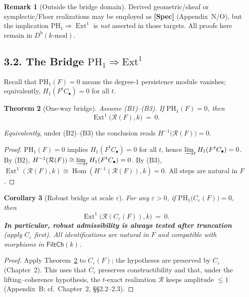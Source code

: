 \documentclass[11pt]{article}
\DeclareMathOperator{\Ext}{Ext}
\DeclareMathOperator{\Hom}{Hom}
\numberwithin{equation}{section}
\newtheorem{theorem}{Theorem}[section]
\newtheorem{corollary}[theorem]{Corollary}
\theoremstyle{definition}
\newtheorem{remark}[theorem]{Remark}
\begin{document}
\begin{remark}[Outside the bridge domain]\label{rk:outside-bridge}
Derived geometric/sheaf or symplectic/Floer realizations may be employed as \textbf{[Spec]} (Appendix~N/O), but the implication \(\mathrm{PH}_1\Rightarrow\Ext^1\) is \emph{not} asserted in those targets. All proofs here remain in \(D^{\mathrm{b}}(k\text{-mod})\).
\end{remark}

\subsection*{3.2. The Bridge \texorpdfstring{$\mathrm{PH}_1\!\Rightarrow\!\mathrm{Ext}^1$}{PH1⇒Ext1}}
Recall that \(\mathrm{PH}_1(F)=0\) means the degree-\(1\) persistence module vanishes; equivalently, \(H_1(F^tC_\bullet)=0\) for all \(t\).

\begin{theorem}[One-way bridge]\label{thm:PH1-to-Ext1}
Assume \textup{(B1)–(B3)}. If \(\mathrm{PH}_1(F)=0\), then
\[
\Ext^1\!\big(\mathcal{R}(F),k\big)\ =\ 0.
\]
\end{theorem}

\noindent\emph{Equivalently}, under \textup{(B2)}–\textup{(B3)} the conclusion reads \(H^{-1}\!\big(\mathcal{R}(F)\big)=0\).

\begin{proof}
\(\mathrm{PH}_1(F)=0\) implies \(H_1(F^tC_\bullet)=0\) for all \(t\), hence \(\varinjlim_t H_1(F^tC_\bullet)=0\). By \textup{(B2)}, \(H^{-1}(\mathcal{R}(F))\cong \varinjlim_t H_1(F^tC_\bullet)=0\). By \textup{(B3)}, \(\Ext^1(\mathcal{R}(F),k)\cong \Hom(H^{-1}(\mathcal{R}(F)),k)=0\). All steps are natural in \(F\).
\end{proof}

\begin{corollary}[Robust bridge at scale \(\varepsilon\)]\label{cor:robust-bridge}
For any \(\varepsilon>0\), if \(\mathrm{PH}_1\!\big(C_\varepsilon(F)\big)=0\), then
\[
\Ext^1\!\big(\mathcal{R}(C_\varepsilon(F)),k\big)\ =\ 0.
\]
\textbf{In particular, robust admissibility is always tested after truncation} (apply $C_\varepsilon$ first).
All identifications are natural in \(F\) and compatible with morphisms in \(\mathsf{FiltCh}(k)\).
\end{corollary}

\begin{proof}
Apply Theorem~\ref{thm:PH1-to-Ext1} to \(C_\varepsilon(F)\); the hypotheses are preserved by \(C_\varepsilon\) (Chapter~2). This uses that \(C_\varepsilon\) preserves constructibility and that, under the lifting–coherence hypothesis, the \(t\)-exact realization \(\mathcal{R}\) keeps amplitude \(\le 1\) (Appendix~B; cf.\ Chapter~2, §§2.2–2.3).
\end{proof}
\end{document}
